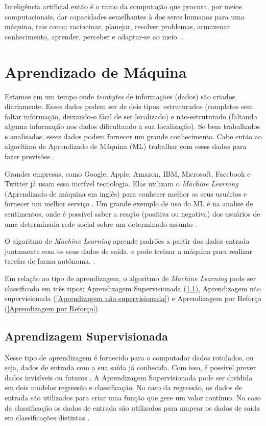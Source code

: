 Inteligência artificial então é o ramo da computação que procura, por meios computacionais, dar capacidades semelhantes à dos seres humanos para uma máquina, tais como: raciocinar, planejar, resolver problemas, armazenar conhecimento, aprender, perceber e adaptar-se ao meio. \cite{Fernando}.

\section{Aprendizado de Máquina}
\label{sec:aprendizado de máquina}

Estamos em um tempo onde \textit{terabytes} de informações (dados) são criados diariamente. Esses dados podem ser de dois tipos: estruturados (completos sem faltar informação, deixando-o fácil de ser localizado) e não-estruturado (faltando alguma informação nos dados dificultando a sua localização). Se bem trabalhados e analisados, esses dados podem fornecer um grande conhecimento. Cabe então ao algorítimo de Aprendizado de Máquina (ML) trabalhar com esses dados para fazer previsões \cite{pythonmachinelearning}. 

Grandes empresas, como Google, Apple, Amazon, IBM, Microsoft, Facebook e Twitter já usam essa incrível tecnologia. Elas utilizam o \textit{Machine Learning} (Aprendizado de máquina em inglês) para conhecer melhor os seus usuários e fornecer um melhor serviço \cite{pythonmachinelearning}. Um grande exemplo de uso do ML é na analise de sentimentos, onde é possível saber a reação (positiva ou negativa) dos usuários de uma determinada rede social sobre um determinado assunto \cite{sentimentos}.

O algoritmo de \textit{Machine Learning} aprende padrões a partir dos dados entrada juntamente com os seus dados de saída. e pode treinar a máquina para realizar tarefas de forma autônoma. \cite{diferencamachinelearning}.

Em relação ao tipo de aprendizagem, o algoritmo de \textit{Machine Learning} pode ser classificado em três tipos: Aprendizagem Supervisionada (\ref{aprendizadagem supervisionada}), Aprendizagem não supervisionada (\ref{Aprendizagem não supervisionada}) e Aprendizagem por Reforço (\ref{Aprendizagem por Reforço}).

\subsection{Aprendizagem Supervisionada}
\label{aprendizadagem supervisionada}
Nesse tipo de aprendizagem é fornecido para o computador dados rotulados, ou seja, dados de entrada com a sua saída já conhecida. Com isso, é possível prever dados invisíveis ou futuros \cite{pythonmachinelearning}. 
A Aprendizagem Supervisionada pode ser dividida em dois modelos regressão e classificação. No caso da regressão, os dados de entrada são utilizados para criar uma função que gere um valor contínuo. No caso da classificação os dados de entrada são utilizados para mapear os dados de saída em classificações distintas \cite{pythonmachinelearning}. 

